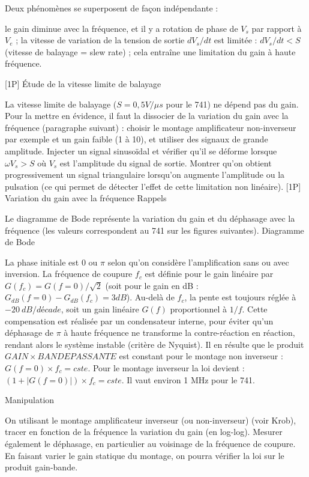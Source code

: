 \documentclass{article}%
\begin{document}
Deux phénomènes se superposent de façon indépendante :

    le gain diminue avec la fréquence, et il y a rotation de phase de $V_{s}$ par rapport à $ V_{e}$ ;
    la vitesse de variation de la tension de sortie $dV_s/dt$ est limitée :  $dV_s/dt < S$ (vitesse de balayage = slew rate) ; cela entraîne une limitation du gain à haute fréquence.

[1P] Étude de la vitesse limite de balayage

La vitesse limite de balayage ($ S = 0,5 V/ \mu s$ pour le 741) ne dépend pas du gain. Pour la mettre en évidence, il faut la dissocier de la variation du gain avec la fréquence (paragraphe suivant) : choisir le montage amplificateur non-inverseur par exemple et un gain faible (1 à 10), et utiliser des signaux de grande amplitude. Injecter un signal sinusoïdal et vérifier qu'il se déforme lorsque $\omega V_{s} > S$ où $V_{s}$ est l'amplitude du signal de sortie. Montrer qu'on obtient progressivement un signal triangulaire lorsqu'on augmente l'amplitude ou la pulsation (ce qui permet de détecter l'effet de cette limitation non linéaire).
[1P] Variation du gain avec la fréquence
Rappels

Le diagramme de Bode représente la variation du gain et du déphasage avec la fréquence (les valeurs correspondent au 741 sur les figures suivantes).
Diagramme de Bode

La phase initiale est 0 ou $\pi$ selon qu'on considère l'amplification sans ou avec inversion. La fréquence de coupure $f_{c}$ est définie pour le gain linéaire par $G(f_{c}) = G(f=0)/\sqrt{2}$ (soit pour le gain en dB : $ G_{dB}(f=0) - G_{dB}(f_{c})= 3{dB}$). Au-delà de $f_{c}$, la pente est toujours réglée à $ -20~dB/décade$, soit un gain linéaire $G(f)$ proportionnel à $1/f$. Cette compensation est réalisée par un condensateur interne, pour éviter qu'un déphasage de $\pi$ à haute fréquence ne transforme la contre-réaction en réaction, rendant alors le système instable (critère de Nyquist). Il en résulte que le produit $GAIN \times BANDE PASSANTE$ est constant pour le montage non inverseur : $G(f=0) \times f_c = cste$. Pour le montage inverseur la loi devient :  $( 1 + |G(f=0)| ) \times f_c = cste$. Il vaut environ 1 MHz pour le 741.

Manipulation

On utilisant le montage amplificateur inverseur (ou non-inverseur) (voir Krob), tracer en fonction de la fréquence la variation du gain (en log-log). Mesurer également le déphasage, en particulier au voisinage de la fréquence de coupure. En faisant varier le gain statique du montage, on pourra vérifier la loi sur le produit gain-bande.
\end{document}
